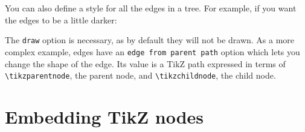 \documentclass{article}
\begin{document}
You can also define a style for all the edges in a tree. For example, if you want the edges to be a little darker:
\begin{center}
\begin{SideBySideExample}
\end{SideBySideExample}
\end{center}
The \verb|draw| option is necessary, as by default they will not be
drawn. As a more complex example, edges have an
\verb|edge from parent path| option which lets you change the shape of
the edge. Its value is a TikZ path expressed in terms of
\verb|\tikzparentnode|, the parent node, and \verb|\tikzchildnode|,
the child node.
\begin{center}
\begin{SideBySideExample}
\end{SideBySideExample}
\end{center}

\clearpage

\section{Embedding TikZ nodes}
\end{document}
